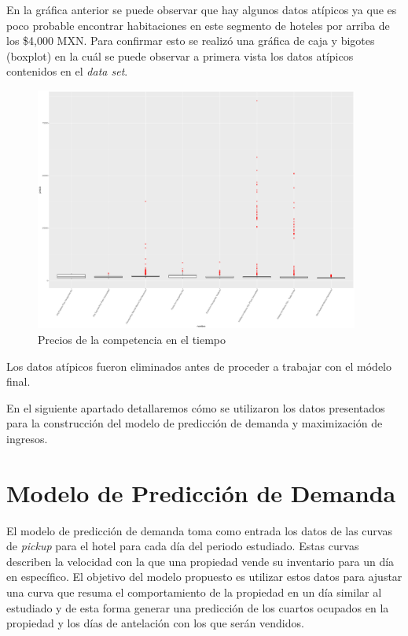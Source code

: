 En la gráfica anterior se puede observar que hay algunos datos atípicos ya que es poco probable encontrar habitaciones en este segmento de hoteles por arriba de los \$4,000 MXN. Para confirmar esto se realizó una gráfica de caja y bigotes (boxplot) en la cuál se puede observar a primera vista los datos atípicos contenidos en el \emph{data set}.

\begin{figure}[H]
  \centering
      \includegraphics[width=\maxwidth,height=8cm]{figures/PreciosBoxPlot-1}    
  \caption{Precios de la competencia en el tiempo}
\end{figure}

Los datos atípicos fueron eliminados antes de proceder a trabajar con el módelo final.

En el siguiente apartado detallaremos cómo se utilizaron los datos presentados para la construcción del modelo de predicción de demanda y maximización de ingresos.


\section*{Modelo de Predicción de Demanda}

El modelo de predicción de demanda toma como entrada los datos de las curvas de \emph{pickup} para el hotel para cada día del periodo estudiado. Estas curvas describen la velocidad con la que una propiedad vende su inventario para un día en específico. El objetivo del modelo propuesto es utilizar estos datos para ajustar una curva que resuma el comportamiento de la propiedad en un día similar al estudiado y de esta forma generar una predicción de los cuartos ocupados en la propiedad y los días de antelación con los que serán vendidos.

